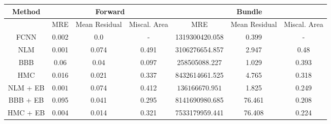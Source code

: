 \documentclass[convert={outext=.png}]{standalone}
\begin{document}
\begin{tabular}{c c c c c c c}
\hline
\hline
Method &  \multicolumn{3}{c}{Forward} & \multicolumn{3}{c}{Bundle} \\ \hline
 & MRE & Mean Residual & Miscal. Area & MRE & Mean Residual & Miscal. Area\\
 FCNN & 0.002 & $\mathbf{0.0}$ & - & 1319300420.058 & $\mathbf{0.399}$ & - \\
 \hline
 NLM & 0.001 & 0.074 & 0.491 & 3106276654.857 & 2.947 & 0.48 \\
 BBB & 0.06 & 0.04 & $\mathbf{0.097}$ & 258505088.227 & 1.029 & 0.393 \\
 HMC & 0.016 & 0.021 & 0.337 & 8432614661.525 & 4.765 & 0.318 \\
 \hline
 NLM + EB & $\mathbf{0.001}$ & 0.074 & 0.412 & $\mathbf{136166670.951}$ & 1.825 & 0.249 \\
 BBB + EB & 0.095 & 0.041 & 0.295 & 8141690980.685 & 76.461 & $\mathbf{0.208}$ \\
 HMC + EB & 0.004 & 0.014 & 0.321 & 7533179959.441 & 76.408 & 0.224 \\
\hline
\hline
\end{tabular}
\end{document}
